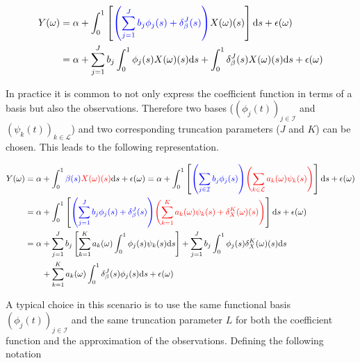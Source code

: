 \documentclass[11pt,twoside,a4paper]{article}
\begin{document}
	\begin{equation}
		\begin{split}
			Y(\omega) & = \alpha + \int_{0}^{1}\left[{\color{blue}\left(\sum_{j = 1}^{J} b_j \phi_j(s) + \delta_{\beta}^{J}(s)\right)} X(\omega)(s) \right]\mathrm{d}s + \epsilon(\omega) \\
			& = \alpha + \sum_{j = 1}^{J} b_j \int_{0}^{1} \phi_j(s) X(\omega)(s) \mathrm{d}s +  \int_{0}^{1} \delta_{\beta}^{J}(s) X(\omega)(s) \mathrm{d}s + \epsilon(\omega)
		\end{split}
	\end{equation}

	In practice it is common to not only express the coefficient function in terms of a basis but also the observations. Therefore two bases ($\left(\phi_j(t)\right)_{j \in \mathcal{I}}$ and $\left(\psi_k(t)\right)_{k \in \mathcal{L}}$) and two corresponding truncation parameters ($J$ and $K$) can be chosen. This leads to the following representation.
	
	\begin{equation}\label{basis_exp_transf}
		\begin{split}
			Y(\omega) & = \alpha + \int_{0}^{1} {\color{blue}\beta(s)} {\color{red}X(\omega)(s)}\mathrm{d}s + \epsilon(\omega)
			 = \alpha + \int_{0}^{1}\left[{\color{blue}\left(\sum_{j \in \mathcal{I}} b_j  \phi_j(s)\right)} {\color{red}\left(\sum_{k \in \mathcal{L}} a_k(\omega)  \psi_k(s)\right)} \right]\mathrm{d}s + \epsilon(\omega) \\
			& = \alpha + \int_{0}^{1}\left[{\color{blue}\left(\sum_{j = 1}^{J} b_j  \phi_j(s) + \delta_{\beta}^{J}(s)\right)} {\color{red}\left(\sum_{k = 1}^K a_k(\omega)  \psi_k(s) + \delta_{X}^{K}(\omega)(s)\right)} \right]\mathrm{d}s + \epsilon(\omega)\\
			& = \alpha + \sum_{j = 1}^J b_j \left[\sum_{k = 1}^K a_k(\omega) \int_{0}^{1} \phi_j(s) \psi_k(s) \mathrm{d}s\right] + \sum_{j = 1}^{J} b_j  \int_{0}^{1} \phi_j(s) \delta_{X}^{K}(\omega)(s) \mathrm{d}s\\
			& \quad \quad + \sum_{k = 1}^{K} a_k(\omega)  \int_{0}^{1} \delta_{\beta}^{J}(s)\phi_j(s) \mathrm{d}s + \epsilon(\omega)
		\end{split}
	\end{equation}

	A typical choice in this scenario is to use the same functional basis $\left(\phi_j(t)\right)_{j \in \mathcal{I}}$ and the same truncation parameter $L$ for both the coefficient function and the approximation of the observations. Defining the following notation 
\end{document}
